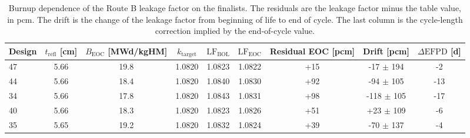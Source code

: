 \begin{table}[htbp]
  \centering
  \caption{Burnup dependence of the Route B leakage factor on the finalists. The residuals are the leakage factor minus the table value, in pcm. The drift is the change of the leakage factor from beginning of life to end of cycle. The last column is the cycle-length correction implied by the end-of-cycle value.}
  \label{tab:kt-burnup}
  \begin{tabular}{lcccccccc}
    \toprule
    Design & $t_\mathrm{refl}$ [cm] & $B_\mathrm{EOC}$ [MWd/kgHM] & $k_\mathrm{target}$ & $\mathrm{LF}_\mathrm{BOL}$ & $\mathrm{LF}_\mathrm{EOC}$ & Residual EOC [pcm] & Drift [pcm] & $\Delta\mathrm{EFPD}$ [d] \\
    \midrule
    47 & 5.66 & 19.8 & 1.0820 & 1.0823 & 1.0822 & +15 & -17 $\pm$ 194 & -2 \\
    44 & 5.66 & 18.4 & 1.0820 & 1.0840 & 1.0830 & +92 & -94 $\pm$ 105 & -13 \\
    34 & 5.66 & 17.8 & 1.0820 & 1.0843 & 1.0831 & +98 & -118 $\pm$ 105 & -17 \\
    40 & 5.66 & 18.3 & 1.0820 & 1.0823 & 1.0826 & +51 & +23 $\pm$ 109 & -6 \\
    35 & 5.65 & 19.2 & 1.0820 & 1.0832 & 1.0824 & +39 & -70 $\pm$ 137 & -4 \\
    \bottomrule
  \end{tabular}
\end{table}

